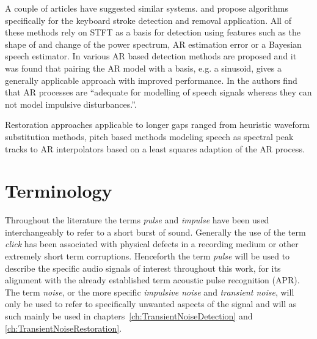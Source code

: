 A couple of articles have suggested similar systems\cite{Subramanya2007}\cite{Sugiyama2007}\cite{Abramson2007}. \cite{Subramanya2007} and \cite{Sugiyama2007} propose algorithms specifically for the keyboard stroke detection and removal application. All of these methods rely on STFT as a basis for detection using features such as the shape of and change of the power spectrum\cite{Sugiyama2007}, AR estimation error\cite{Subramanya2007}\cite{Kauppinen2002} or a Bayesian speech estimator\cite{Abramson2007}. In \cite{Godsill1998book} various AR based detection methods are proposed and it was found that pairing the AR model with a basis, e.g. a sinusoid, gives a generally applicable approach with improved performance. In \cite{Vaseghi1990} the authors find that AR processes are ``adequate for modelling of speech signals whereas they can not model impulsive disturbances.''.

Restoration approaches applicable to longer gaps ranged from heuristic waveform substitution methods\cite{Goodman1986}\cite{Niediwiecki2001}, pitch based methods modeling speech as spectral peak tracks\cite{Maher1994}\cite{McAulay1986} to AR interpolators\cite{Esquef2006} based on a least squares adaption of the AR process\cite{Godsill1998book}.


\section{Terminology}
Throughout the literature the terms \emph{pulse}\cite{Esquef2002a}\cite{Esquef2003a} and \emph{impulse}\cite{Czyzewski1995}\cite{Kauppinen2002a}\cite{Chen2000} have been used interchangeably to refer to a short burst of sound. Generally the use of the term \emph{click}\cite{Czyzewski1995}\cite{Esquef2002}\cite{Godsill1998book} has been associated with physical defects in a recording medium or other extremely short term corruptions. Henceforth the term \emph{pulse} will be used to describe the specific audio signals of interest throughout this work, for its alignment with the already established term acoustic pulse recognition (APR)\cite{TouchSystems2006}. The term \emph{noise}, or the more specific \emph{impulsive noise} and \emph{transient noise}, will only be used to refer to specifically unwanted aspects of the signal and will as such mainly be used in chapters~\ref{ch:TransientNoiseDetection} and \ref{ch:TransientNoiseRestoration}.

